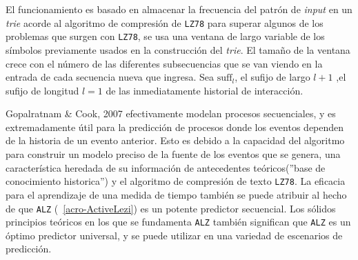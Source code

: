 \begin{enumerate}
{El funcionamiento es basado en almacenar la frecuencia del patrón de \emph{input} en un \emph{trie} acorde al algoritmo de compresión de \texttt{LZ78} para superar algunos de los problemas que surgen con \texttt{LZ78}, se usa una ventana de largo variable de los símbolos previamente usados en la construcción del \emph{trie}. El tamaño de la ventana crece con el número de las diferentes subsecuencias que se van viendo en la entrada de cada secuencia nueva que ingresa.  Sea ${\mbox{suff}}_{l}$,  el sufijo de largo $l+1$ ,el sufijo de longitud $l=1$ de las inmediatamente historial de interacción.%

Gopalratnam \& Cook, 2007 \etal\cite{Gopalratnam2007} efectivamente modelan procesos secuenciales, y es extremadamente útil para la predicción de procesos donde los eventos dependen de la historia de un evento anterior. Esto es debido a la capacidad del algoritmo para construir un modelo preciso de la fuente de los eventos que se genera, una característica heredada de su información de antecedentes teóricos(''base de conocimiento historica'') y el algoritmo de compresión de texto \texttt{LZ78}. La eficacia para el aprendizaje de una medida de tiempo también se puede atribuir al hecho de que \texttt{ALZ} (~\ref{acro-ActiveLezi}) es un potente predictor secuencial. Los sólidos principios teóricos en los que se fundamenta \texttt{ALZ} también significan que \texttt{ALZ} es un óptimo predictor universal, y se puede utilizar en una variedad de escenarios de predicción.
	
  	
  	  

 
 
 }




\end{enumerate}
